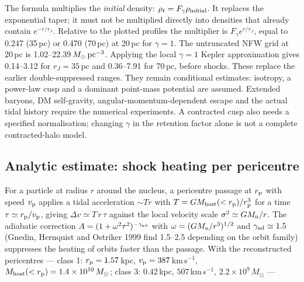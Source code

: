\documentclass[11pt,a4paper]{article}
\begin{document}
The formula multiplies the \emph{initial} density: $\rho_t=F_\gamma\rho_{\rm initial}$.
It replaces the exponential taper; it must not be multiplied directly into densities that
already contain $e^{-r/r_J}$. Relative to the plotted profiles the multiplier is
$F_\gamma e^{r/r_J}$, equal to 0.247 (35\,pc) or 0.470 (70\,pc) at 20\,pc for $\gamma=1$.
The untruncated NFW grid at 20\,pc is 1.02--22.39\,$M_\odot\,{\rm pc^{-3}}$.
Applying the local $\gamma=1$ Kepler approximation gives 0.14--3.12 for $r_J=35$\,pc and
0.36--7.91 for 70\,pc, before shocks. These replace the earlier double-suppressed ranges.
They remain conditional estimates: isotropy, a power-law cusp and a dominant point-mass
potential are assumed. Extended baryons, DM self-gravity, angular-momentum-dependent
escape and the actual tidal history require the numerical experiments. A contracted cusp
also needs a specified normalisation; changing $\gamma$ in the retention factor alone
is not a complete contracted-halo model.

\subsection{Analytic estimate: shock heating per pericentre}
For a particle at radius $r$ around the nucleus, a pericentre passage at $r_{\rm p}$ with speed $v_{\rm p}$ applies a tidal acceleration $\sim T r$ with $T=GM_{\rm host}(<r_{\rm p})/r_{\rm p}^{3}$ for a time $\tau\simeq r_{\rm p}/v_{\rm p}$, giving $\Delta v\simeq T\,r\,\tau$ against the local velocity scale $\sigma^2\simeq GM_{\rm n}/r$. The adiabatic correction $A=(1+\omega^2\tau^2)^{-\gamma_{\rm ad}}$ with $\omega=(GM_{\rm n}/r^3)^{1/2}$ and $\gamma_{\rm ad}\simeq1.5$ (Gnedin, Hernquist and Ostriker 1999 find 1.5--2.5 depending on the orbit family) suppresses the heating of orbits faster than the passage. With the reconstructed pericentres --- class 1: $r_{\rm p}=1.57$\,kpc, $v_{\rm p}=387$\,km\,s$^{-1}$, $M_{\rm host}(<r_{\rm p})=1.4\times10^{10}\,M_\odot$; class 3: $0.42$\,kpc, $507$\,km\,s$^{-1}$, $2.2\times10^{9}\,M_\odot$ ---
\end{document}
